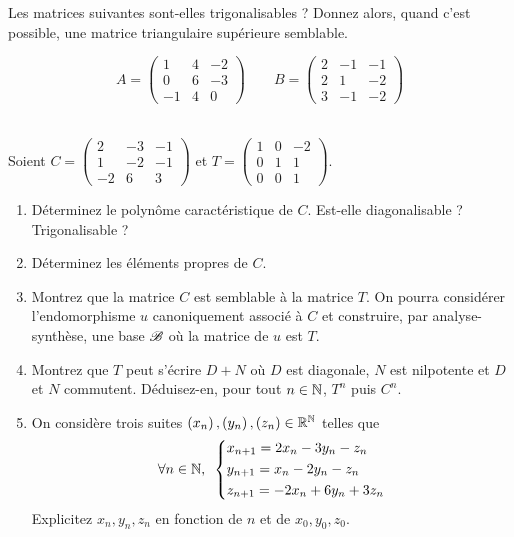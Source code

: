 \begin{exos}[Exercice 19]
Les matrices suivantes sont-elles trigonalisables ? Donnez alors, quand c'est possible, une matrice triangulaire supérieure semblable.

\[A=\begin{pmatrix}
1 & 4 & -2 \\
0 & 6 & -3 \\
-1 & 4 & 0
\end{pmatrix}\qquad B=\begin{pmatrix}
2 & -1 & -1 \\
2 & 1 & -2 \\
3 & -1 & -2
\end{pmatrix}\]
\end{exos}



\begin{exos}[Exercice 20]~\\
Soient \(C=\begin{pmatrix}
2 & -3 & -1 \\
1 & -2 & -1 \\
-2 & 6 & 3
\end{pmatrix}\) et \(T=\begin{pmatrix}
1 & 0 & -2 \\
0 & 1 & 1 \\
0 & 0 & 1
\end{pmatrix}\).

\begin{enumerate}
    \item Déterminez le polynôme caractéristique de \(C\). Est-elle diagonalisable ? Trigonalisable ? \\
    \item Déterminez les éléments propres de \(C\). \\
    \item Montrez que la matrice \(C\) est semblable à la matrice \(T\). On pourra considérer l'endomorphisme \(u\) canoniquement associé à \(C\) et construire, par analyse-synthèse, une base \(\mathscr{B}\) où la matrice de \(u\) est \(T\). \\
    \item Montrez que \(T\) peut s'écrire \(D+N\) où \(D\) est diagonale, \(N\) est nilpotente et \(D\) et \(N\) commutent. Déduisez-en, pour tout \(n\in\mathbb{N}\), \(T^n\) puis \(C^n\). \\
    \item On considère trois suites \(\left(x_n\right),\left(y_n\right),\left(z_n\right)\in\mathbb{R}^{\mathbb{N}}\) telles que \[\quantifs{\forall n\in\N}\begin{dcases}
        x_{n+1}=2x_n-3y_n-z_n \\
        y_{n+1}=x_n-2y_n-z_n \\
        z_{n+1}=-2x_n+6y_n+3z_n
    \end{dcases}\] Explicitez \(x_n,y_n,z_n\) en fonction de \(n\) et de \(x_0,y_0,z_0\).
\end{enumerate}
\end{exos}




